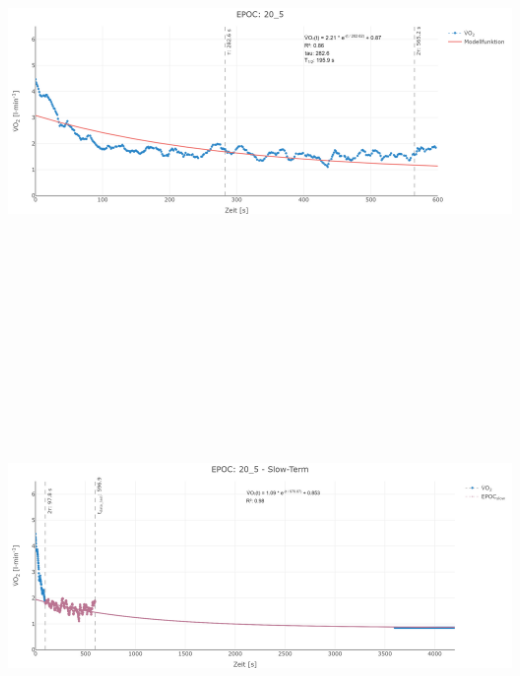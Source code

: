\documentclass[
  letterpaper,
  DIV=11]{scrartcl}
\begin{document}
\includegraphics[width=11.45833in,height=4.6875in]{images/20_5_tau.png}
\includegraphics[width=11.45833in,height=4.6875in]{images/20_5_slow.png}
\end{document}
